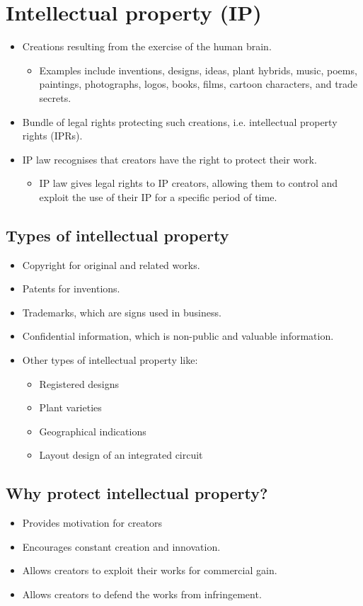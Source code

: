 \documentclass[11pt]{article}
\begin{document}
\section{Intellectual property (IP)}
\label{sec:orga8dde73}
\begin{itemize}
\item Creations resulting from the exercise of the human brain.
\begin{itemize}
\item Examples include inventions, designs, ideas, plant hybrids, music, poems, paintings, photographs, logos, books, films, cartoon characters, and trade secrets.
\end{itemize}

\item Bundle of legal rights protecting such creations, i.e. intellectual property rights (IPRs).
\item IP law recognises that creators have the right to protect their work.
\begin{itemize}
\item IP law gives legal rights to IP creators, allowing them to control and exploit the use of their IP for a specific period of time.
\end{itemize}
\end{itemize}

\subsection{Types of intellectual property}
\label{sec:orgf090ed9}
\begin{itemize}
\item Copyright for original and related works.
\item Patents for inventions.
\item Trademarks, which are signs used in business.
\item Confidential information, which is non-public and valuable information.
\item Other types of intellectual property like:
\begin{itemize}
\item Registered designs
\item Plant varieties
\item Geographical indications
\item Layout design of an integrated circuit
\end{itemize}
\end{itemize}

\subsection{Why protect intellectual property?}
\label{sec:org0677523}
\begin{itemize}
\item Provides motivation for creators
\item Encourages constant creation and innovation.
\item Allows creators to exploit their works for commercial gain.
\item Allows creators to defend the works from infringement.
\end{itemize}
\end{document}
